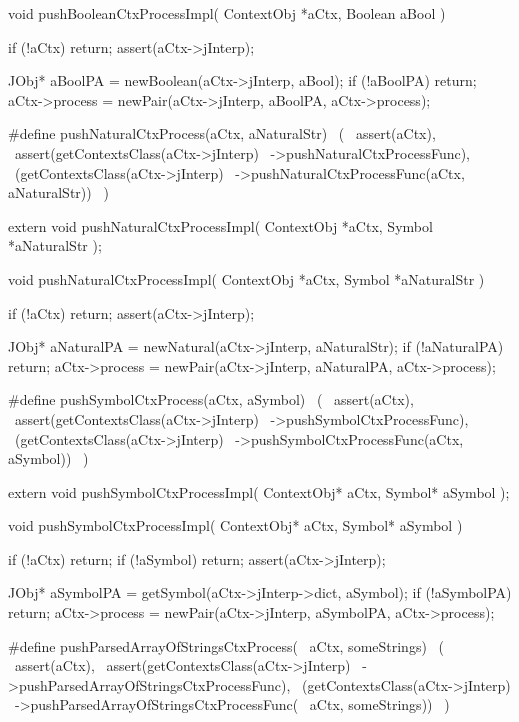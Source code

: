 \startCCode
void pushBooleanCtxProcessImpl(
  ContextObj *aCtx,
  Boolean     aBool
) {
  if (!aCtx) return;
  assert(aCtx->jInterp);

  JObj* aBoolPA = newBoolean(aCtx->jInterp, aBool);
  if (!aBoolPA) return;
  aCtx->process = newPair(aCtx->jInterp, aBoolPA, aCtx->process);
}
\stopCCode

\startCHeader
#define pushNaturalCtxProcess(aCtx, aNaturalStr)      \
  (                                                   \
    assert(aCtx),                                     \
    assert(getContextsClass(aCtx->jInterp)            \
      ->pushNaturalCtxProcessFunc),                   \
    (getContextsClass(aCtx->jInterp)                  \
      ->pushNaturalCtxProcessFunc(aCtx, aNaturalStr)) \
  )
\stopCHeader

\setCHeaderStream{private}
\startCHeader
extern void pushNaturalCtxProcessImpl(
  ContextObj *aCtx,
  Symbol     *aNaturalStr
);
\stopCHeader
\setCHeaderStream{public}

\startCCode
void pushNaturalCtxProcessImpl(
  ContextObj *aCtx,
  Symbol     *aNaturalStr
) {
  if (!aCtx) return;
  assert(aCtx->jInterp);

  JObj* aNaturalPA = newNatural(aCtx->jInterp, aNaturalStr);
  if (!aNaturalPA) return;
  aCtx->process = newPair(aCtx->jInterp, aNaturalPA, aCtx->process);
}
\stopCCode

\startCHeader
#define pushSymbolCtxProcess(aCtx, aSymbol)      \
  (                                              \
    assert(aCtx),                                \
    assert(getContextsClass(aCtx->jInterp)       \
      ->pushSymbolCtxProcessFunc),               \
    (getContextsClass(aCtx->jInterp)             \
      ->pushSymbolCtxProcessFunc(aCtx, aSymbol)) \
  )
\stopCHeader

\startCHeader
extern void pushSymbolCtxProcessImpl(
  ContextObj* aCtx,
  Symbol* aSymbol
);
\stopCHeader
\setCHeaderStream{public}

\startCCode
void pushSymbolCtxProcessImpl(
  ContextObj* aCtx,
  Symbol* aSymbol
) {
  if (!aCtx) return;
  if (!aSymbol) return;
  assert(aCtx->jInterp);

  JObj* aSymbolPA =
    getSymbol(aCtx->jInterp->dict, aSymbol);
  if (!aSymbolPA) return;
  aCtx->process = newPair(aCtx->jInterp, aSymbolPA, aCtx->process);
}
\stopCCode

\startCHeader
#define pushParsedArrayOfStringsCtxProcess(      \
  aCtx, someStrings)                             \
  (                                              \
    assert(aCtx),                                \
    assert(getContextsClass(aCtx->jInterp)       \
      ->pushParsedArrayOfStringsCtxProcessFunc), \
    (getContextsClass(aCtx->jInterp)             \
      ->pushParsedArrayOfStringsCtxProcessFunc(  \
        aCtx, someStrings))                      \
  )
\stopCHeader

